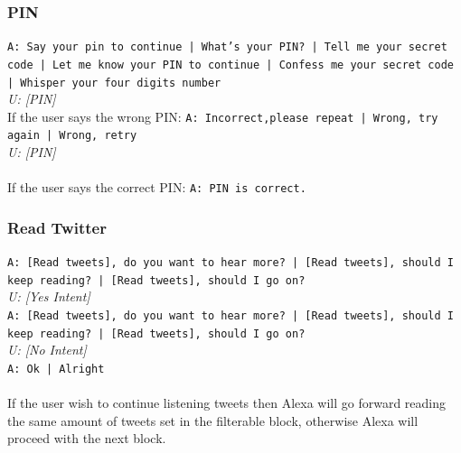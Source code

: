 \subsubsection{PIN}
\texttt{A: Say your pin to continue | What's your PIN? | Tell me your secret code | Let me know your PIN to continue | Confess me your secret code | Whisper your four digits number}\\
\textit{U: [PIN] }\\
If the user says the wrong PIN:
\texttt{A: Incorrect,please repeat | Wrong, try again | Wrong, retry }\\
\textit{U: [PIN]}\\\\
If the user says the correct PIN:
\texttt{A: PIN is correct.}\\

\subsubsection{Read Twitter}
\texttt{A: [Read tweets], do you want to hear more? | [Read tweets], should I keep reading? | [Read tweets], should I go on?}\\
\textit{U: [Yes Intent]}\\
\texttt{A: [Read tweets], do you want to hear more? | [Read tweets], should I keep reading? | [Read tweets], should I go on?}\\
\textit{U: [No Intent]}\\
\texttt{A: Ok | Alright}\\\\
If the user wish to continue listening tweets then Alexa will go forward reading the same amount of tweets set in the filterable block, otherwise Alexa will proceed with the next block.

